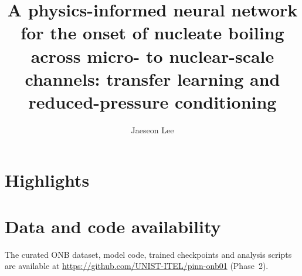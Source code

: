 \documentclass[review,1p,12pt,a4paper]{elsarticle}
\begin{document}
\linenumbers %

\begin{frontmatter}

\title{A physics-informed neural network for the onset of nucleate boiling
across micro- to nuclear-scale channels: transfer learning and
reduced-pressure conditioning}

\author[unist]{Jaeseon Lee}


\address[unist]{Innovative Thermal Engineering Laboratory,
Department of Mechanical Engineering,
Ulsan National Institute of Science and Technology,
50 UNIST Rd., Ulsan 44919, Republic of Korea}




\end{frontmatter}

\section*{Highlights}











\section*{Data and code availability}
The curated ONB dataset, model code, trained checkpoints and analysis scripts
are available at \url{https://github.com/UNIST-ITEL/pinn-onb01} (Phase~2).
\end{document}

